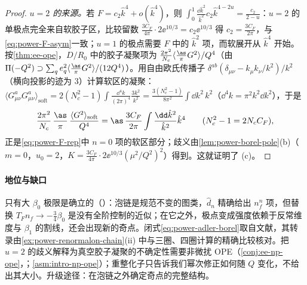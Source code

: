 \begin{proof}
\emph{$u=2$ 的来源。}若 $F=c_2\hat k^4+o(\hat k^4)$，则 $\int_0^1\frac{\dd\hat k^2}{\hat k^2}c_2\hat k^{4-2u}=\frac{c_2}{2-u}$：$u=2$ 的单极点完全来自软胶子区，比较留数 $\frac{3C_F}{4\pi}\cdot2\ee^{10/3}=c_2\ee^{10/3}$ 得 $c_2=\frac{3C_F}{2\pi}$，与\eqref{eq:power-F-asym}一致；$u=1$ 的极点需要 $F$ 中的 $\hat k^2$ 项，而软展开从 $\hat k^4$ 开始。按\cref{thm:ee-ope}，$D/R_0$ 中的胶子凝聚项为 $\frac{2\pi^2}{N_c}\langle\frac{\as}{\pi}G^2\rangle/Q^4$（由 $\Pi(-Q^2)\supset\sum_qe_q^2\langle\frac{\as}{\pi}G^2\rangle/(12Q^4)$）。用自由欧氏传播子 $\delta^{ab}(\delta_{\mu\nu}-k_\mu k_\nu/k^2)/k^2$（横向投影的迹为 3）计算软区的凝聚：$\langle G^a_{\mu\nu}G^a_{\mu\nu}\rangle_{\mathrm{soft}}=2(N_c^2-1)\int\frac{\dd^4k}{(2\pi)^4}\frac{3k^2}{k^2}=\frac{3(N_c^2-1)}{8\pi^2}\int\dd k^2\,k^2$（$\dd^4k=\pi^2k^2\dd k^2$），于是
\begin{equation}\label{eq:power-soft-condensate}
\frac{2\pi^2}{N_c}\,\frac{\as}{\pi}\,\frac{\langle G^2\rangle_{\mathrm{soft}}}{Q^4}=\as\,\frac{3C_F}{2\pi}\int\frac{\dd\hat k^2}{\hat k^2}\hat k^4\qquad(N_c^2-1=2N_cC_F),
\end{equation}
正是\eqref{eq:power-F-rep}中 $n=0$ 项的软区部分；歧义由\cref{lem:power-borel-pole}(b)（$m=0$，$u_0=2$，$K=\frac{3C_F}{4\pi}\cdot2\ee^{10/3}(\mu^2/Q^2)^2$）得到。这就证明了 (c)。
\end{proof}

\paragraph{地位与缺口}
只有大 $\beta_0$ 极限是确立的（\tagP）：泡链是规范不变的图类，$\hat d_n$ 精确给出 $n_f^n$ 项，但替换 $T_Fn_f\to-\frac34\beta_0$ 是没有全阶控制的近似；在它之外，极点变成强度依赖于反常维度与 $\beta_1$ 的割线，还会出现新的奇点\cite[第~3~节]{Beneke1999}。闭式\eqref{eq:power-adler-borel}取自文献，其转录由\cref{ex:power-renormalon-chain}(ii) 中与三圈、四圈计算的精确比较核对。把 $u=2$ 的歧义解释为真空胶子凝聚的不确定性需要非微扰 OPE（\cref{conj:ee-np-ope}，\tagC；\cref{asm:intro-np-ope}）；重整化子只告诉我们幂次修正如何随 $Q$ 变化，不给出其大小\cite[第~4.2.1~节]{Beneke1999}。升级途径：在泡链之外确定奇点的完整结构。


